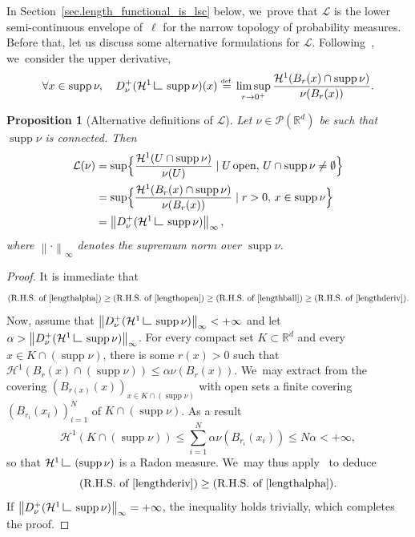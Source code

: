 \documentclass[10pt]{amsart}
\newtheorem{proposition}[theorem]{Proposition}
\theoremstyle{definition}
\newcommand{\eqdef}{\ensuremath{\stackrel{\mbox{\upshape\tiny def.}}{=}}}
\newcommand{\norm}[1]{\left\lVert#1\right\rVert}
\newcommand\LM[1]{\hbox{\vrule width.5pt \vbox to#1pt{\vfill \hrule width#1pt height.5pt}}}
\newcommand\LL{{\mathchoice {\>\LM7\>}{\>\LM7\>}{\,\LM5\,}{\,\LM{3.35}\,}}}
\newcommand{\mres}{\LL}
\newcommand\cH{\mathcal{H}}
\newcommand{\RR}{\mathbb{R}}
\DeclareMathOperator{\supp}{supp}
\newcommand{\Benscond}[2]{\Bigl\{#1 \mid #2\Bigr\} }
\begin{document}
In Section~\ref{sec.length_functional_is_lsc} below, we~prove that $\mathcal{L}$ is the lower semi-continuous envelope of~$\ell$ for the narrow topology of probability measures. Before that, let us discuss some alternative formulations for $\mathcal{L}$. Following~\cite[\S 2.4]{ambrosio2000functions}, we~consider the upper derivative,
\begin{equation}
\forall x \in \supp\nu,\quad D^+_\nu(\cH^1\mres \supp\nu)(x) \eqdef \limsup_{r\to 0^+} \frac{\cH^1(B_r(x)\cap \supp \nu)}{\nu(B_r(x))}.
\end{equation}

\begin{proposition}[Alternative definitions of $\mathcal{L}$]
Let $\nu \in \mathcal{P}(\RR^d)$ be such that $\supp \nu$ is connected. Then
\begin{align}
\mathcal{L}(\nu) &=\sup \Benscond{\frac{\cH^1(U \cap \supp \nu)}{\nu(U)}}{U \,\text{open},\, U\cap \supp \nu\neq \emptyset}\label{lengthopen}\\
&=\sup \Benscond{\frac{\cH^1(B_r(x)\cap \supp \nu)}{\nu(B_r(x))}}{r>0,\, x \in \supp \nu} \label{lengthball}\\
&= \norm{D^+_\nu(\cH^1\mres \supp\nu)}_{\infty},\label{lengthderiv}
\end{align}
where $\norm{\cdot}_\infty$ denotes the supremum norm over $\supp \nu$.
\end{proposition}

\begin{proof}
It is immediate that
\begin{equation*}
\left(\mbox{R.H.S. of \eqref{lengthalpha}}\right)\geq \left(\mbox{R.H.S. of \eqref{lengthopen}}\right)\geq \left(\mbox{R.H.S. of \eqref{lengthball}}\right)\geq(\mbox{R.H.S. of \eqref{lengthderiv}}).
\end{equation*}
Now, assume that $\norm{D^+_\nu(\cH^1\mres \supp\nu)}_{\infty}<+\infty$ and let $\alpha > \norm{D^+_\nu(\cH^1\mres \supp\nu)}_{\infty}$. For every compact set $K \subset \RR^d$ and every $x \in K\cap \left(\supp \nu\right)$, there is some $r(x)>0$ such that $\cH^1\left(B_r(x)\cap \left(\supp \nu\right)\right)\leq \alpha \nu(B_r(x))$. We~may extract from the covering $(B_{r(x)}(x))_{x \in K\cap \left(\supp\nu\right)}$ with open sets a finite covering $(B_{r_i}(x_i))_{i=1}^{N}$ of $K\cap \left(\supp \nu\right)$. As a result
\begin{equation*}
\cH^1(K\cap \left(\supp\nu\right))\leq \sum_{i=1}^{N} \alpha \nu(B_{r_i}(x_i))\leq N\alpha<+\infty,
\end{equation*}
so that $\cH^1\mres\left(\supp\nu\right)$ is a Radon measure. We~may thus apply~\cite[Prop.\,2.21]{ambrosio2000functions} to deduce
\begin{equation*}
\left(\mbox{R.H.S. of \eqref{lengthderiv}}\right)\geq(\mbox{R.H.S. of \eqref{lengthalpha}}).
\end{equation*}
If $\norm{D^+_\nu(\cH^1\mres \supp\nu)}_{\infty}=+\infty$, the inequality holds trivially, which completes the proof.
\end{proof}
\end{document}
